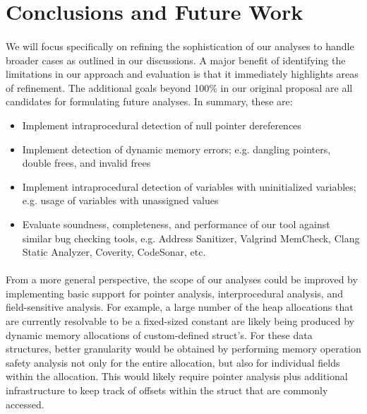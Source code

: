 \documentclass[letterpaper,11pt]{article}
\begin{document}
\section{Conclusions and Future Work}
\paragraph{}
We will focus specifically on refining the sophistication of our analyses
to handle broader cases as outlined in our discussions. A major benefit of
identifying the limitations in our approach and evaluation is that it
immediately highlights areas of refinement. The additional goals beyond 100\%
in our original proposal are all candidates for formulating future analyses.
In summary, these are:

\begin{itemize}
  \item Implement intraprocedural detection of null pointer dereferences
  \item  Implement detection of dynamic memory errors; e.g. dangling pointers,
double frees, and invalid frees
\item Implement intraprocedural detection of variables with uninitialized
variables; e.g. usage of variables with unassigned values
\item Evaluate soundness, completeness, and performance of our tool
  against similar bug checking tools, e.g. Address Sanitizer, Valgrind
  MemCheck, Clang Static Analyzer, Coverity, CodeSonar, etc.
\end{itemize}

\paragraph{}
From a more general perspective, the scope of our analyses could be improved by
implementing basic support for pointer analysis, interprocedural analysis, and
field-sensitive analysis. For example, a large number of the heap allocations
that are currently resolvable to be a fixed-sized constant are likely being
produced by dynamic memory allocations of custom-defined struct’s. For these
data structures, better granularity would be obtained by performing memory
operation safety analysis not only for the entire allocation, but also for
individual fields within the allocation. This would likely require pointer
analysis plus additional infrastructure to keep track of offsets within the
struct that are commonly accessed.
\end{document}
